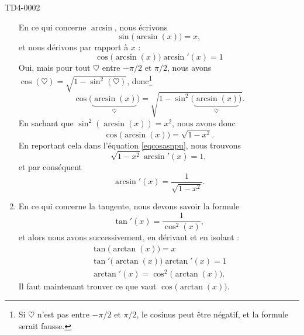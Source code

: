 \begin{corrige}{TD4-0002}
\begin{enumerate}
			En ce qui concerne $\arcsin$, nous écrivons
			\begin{equation}
				\sin\big( \arcsin(x) \big)=x,
			\end{equation}
			et nous dérivons par rapport à $x$ :
			\begin{equation}			\label{eqcosasnpu}
				\cos\big( \arcsin(x) \big)\arcsin'(x)=1
			\end{equation}
            Oui, mais pour tout $\heartsuit$ entre \( -\pi/2\) et \( \pi/2\), nous avons $\cos(\heartsuit)=\sqrt{1-\sin^2(\heartsuit)}$, donc\footnote{Si \( \heartsuit\) n'est pas entre \( -\pi/2\) et \( \pi/2\), le cosinus peut être négatif, et la formule serait fausse.}
			\begin{equation}
				\cos\big( \underbrace{\arcsin(x)}_{\heartsuit} \big)=\sqrt{1-\sin^2\big( \underbrace{\arcsin(x)}_{\heartsuit} \big)}.
			\end{equation}
			En sachant que $\sin^2(\arcsin(x))=x^2$, nous avons donc
			\begin{equation}
				\cos\big( \arcsin(x) \big)=\sqrt{1-x^2}.
			\end{equation}
			En reportant cela dans l'équation \eqref{eqcosasnpu}, nous trouvons
			\begin{equation}
				\sqrt{1-x^2}\arcsin'(x)=1,
			\end{equation}
			et par conséquent
			\begin{equation}
				\arcsin'(x)=\frac{1}{ \sqrt{1-x^2} }.
			\end{equation}

		\item
			En ce qui concerne la tangente, nous devons savoir la formule
			\begin{equation}
				\tan'(x)=\frac{1}{ \cos^2(x) },
			\end{equation}
			et alors nous avons successivement, en dérivant et en isolant :
	\label{Eqsubatantancos}
    \begin{subequations}
        \begin{align}
					\tan\big(\arctan(x)\big)=x\\
					\tan'\big( \arctan(x) \big)\arctan'(x)=1\\
                    \arctan'(x)=\cos^2\big( \arctan(x) \big)    \label{EqsubatantancosddQZLe}.
        \end{align}
    \end{subequations}
			Il faut maintenant trouver ce que vaut $\cos\big( \arctan(x) \big)$.
            

\end{enumerate}
\end{corrige}
